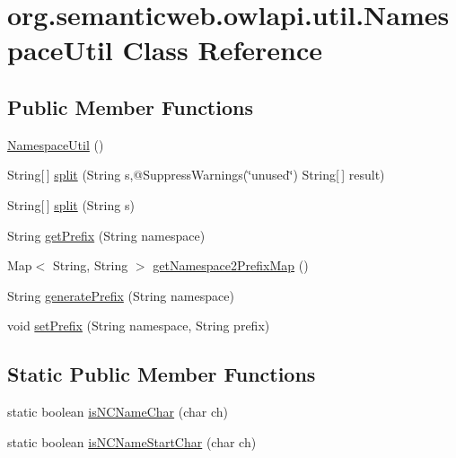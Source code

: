 \hypertarget{classorg_1_1semanticweb_1_1owlapi_1_1util_1_1_namespace_util}{\section{org.\-semanticweb.\-owlapi.\-util.\-Namespace\-Util Class Reference}
\label{classorg_1_1semanticweb_1_1owlapi_1_1util_1_1_namespace_util}
}
\subsection*{Public Member Functions}
\begin{DoxyCompactItemize}
\item 
\hyperlink{classorg_1_1semanticweb_1_1owlapi_1_1util_1_1_namespace_util_a8e82aaf7958554ab0864bcc1be0fe391}{Namespace\-Util} ()
\item 
String\mbox{[}$\,$\mbox{]} \hyperlink{classorg_1_1semanticweb_1_1owlapi_1_1util_1_1_namespace_util_a2c251ad3aa8b5a352bdaf0d4935bb7a1}{split} (String s,@Suppress\-Warnings(\char`\"{}unused\char`\"{}) String\mbox{[}$\,$\mbox{]} result)
\item 
String\mbox{[}$\,$\mbox{]} \hyperlink{classorg_1_1semanticweb_1_1owlapi_1_1util_1_1_namespace_util_a0b5dc7c6aaf453f563f705dcbb66aea3}{split} (String s)
\item 
String \hyperlink{classorg_1_1semanticweb_1_1owlapi_1_1util_1_1_namespace_util_a9fb4b3f779c76d71cf8b950bec459835}{get\-Prefix} (String namespace)
\item 
Map$<$ String, String $>$ \hyperlink{classorg_1_1semanticweb_1_1owlapi_1_1util_1_1_namespace_util_a4d74a44dc3ba9dd11eac50c74e292c6d}{get\-Namespace2\-Prefix\-Map} ()
\item 
String \hyperlink{classorg_1_1semanticweb_1_1owlapi_1_1util_1_1_namespace_util_a05b98020835869359b26c3ff7e439c20}{generate\-Prefix} (String namespace)
\item 
void \hyperlink{classorg_1_1semanticweb_1_1owlapi_1_1util_1_1_namespace_util_a168acb96d425e55fbbcd6fdf548affc6}{set\-Prefix} (String namespace, String prefix)
\end{DoxyCompactItemize}
\subsection*{Static Public Member Functions}
\begin{DoxyCompactItemize}
\item 
static boolean \hyperlink{classorg_1_1semanticweb_1_1owlapi_1_1util_1_1_namespace_util_a44cd2f48733f6a7d3daea24ff0c0416d}{is\-N\-C\-Name\-Char} (char ch)
\item 
static boolean \hyperlink{classorg_1_1semanticweb_1_1owlapi_1_1util_1_1_namespace_util_a838988b444254b91e77687c86e6635e4}{is\-N\-C\-Name\-Start\-Char} (char ch)
\end{DoxyCompactItemize}
